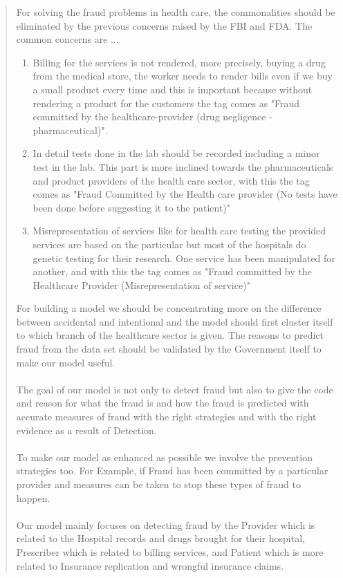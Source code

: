 \documentclass{ieeeaccess}
\begin{document}
\begin{abstract}
For solving the fraud problems in health care, the commonalities should be eliminated by the previous concerns raised by the FBI and FDA. The common concerns are ...
\begin{enumerate}
	\item Billing for the services is not rendered, more precisely, buying a drug from the medical store, the worker needs to render bills even if we buy a small product every time and this is important because without rendering a product for the customers the tag comes as "Fraud committed by the healthcare-provider (drug negligence -pharmaceutical)". 
	\item In detail tests done in the lab should be recorded including a minor test in the lab. This part is more inclined towards the pharmaceuticals and product providers of the health care sector, with this the tag comes as "Fraud Committed by the Health care provider (No tests have been done before suggesting it to the patient)"
	\item Misrepresentation of services like for health care testing the provided services are based on the particular but most of the hospitals do genetic testing for their research. One service has been manipulated for another, and with this the tag comes as "Fraud committed by the Healthcare Provider (Misrepresentation of service)"
\end{enumerate}
For building a model we should be concentrating more on the difference between accidental and intentional and the model should first cluster itself to which branch of the healthcare sector is given. The reasons to predict fraud from the data set should be validated by the Government itself to make our model useful.\\\\
The goal of our model is not only to detect fraud but also to give the code and reason for what the fraud is and how the fraud is predicted with accurate measures of fraud with the right strategies and with the right evidence as a result of Detection. \\\\
To make our model as enhanced as possible we involve the prevention strategies too. For Example, if Fraud has been committed by a particular provider and measures can be taken to stop these types of fraud to happen.\\\\
Our model mainly focuses on detecting fraud by the Provider which is related to the Hospital records and drugs brought for their hospital, Prescriber which is related to billing services, and Patient which is more related to Insurance replication and wrongful insurance claims.
\end{abstract}
\end{document}
